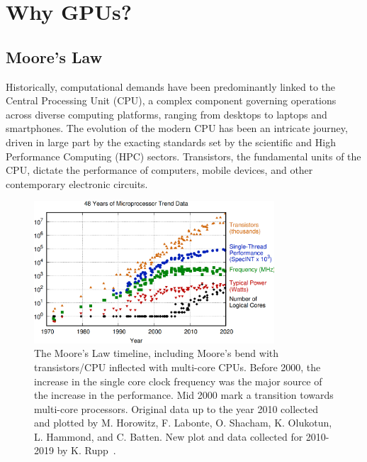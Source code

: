 \section{Why GPUs?}


\subsection{Moore’s Law}


\par
Historically, computational demands have been predominantly linked to the Central Processing Unit (CPU), a complex component governing operations across diverse computing platforms, ranging from desktops to laptops and smartphones. The evolution of the modern CPU has been an intricate journey, driven in large part by the exacting standards set by the scientific and High Performance Computing (HPC) sectors. Transistors, the fundamental units of the CPU, dictate the performance of computers, mobile devices, and other contemporary electronic circuits.

\begin{figure}[!h]
\centering\includegraphics[width=0.8\textwidth]{fig_logo_history/microprocessor_trend.png}
\caption{The Moore’s Law timeline, including Moore's bend with transistors/CPU inflected with multi-core CPUs. Before 2000, the increase in the single core clock frequency was the major source of the increase in the performance. Mid 2000 mark a transition towards multi-core processors. Original data up to the year 2010 collected and plotted by M. Horowitz, F. Labonte, O. Shacham, K. Olukotun, L. Hammond, and C. Batten. New plot and data collected for 2010-2019 by K. Rupp~\cite{microprocessor-trend-data}. }\label{fig:microprocessor_trend}
\end{figure}


